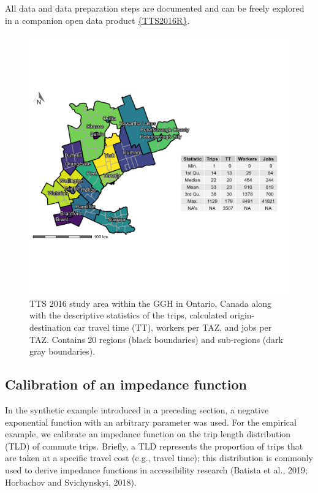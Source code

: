 \documentclass[]{elsarticle} %
\begin{document}
All data and data preparation steps are documented and can be freely
explored in a companion open data product
\href{https://github.com/soukhova/TTS2016R}{\{TTS2016R\}}.

\begin{figure}

{\centering \includegraphics[width=0.8\linewidth]{images/TTS16-survey-area} 

}

\caption{\label{fig:TTS-16-survey-area}TTS 2016 study area within the GGH in Ontario, Canada along with the descriptive statistics of the trips, calculated origin-destination car travel time (TT), workers per TAZ, and jobs per TAZ. Contains 20 regions (black boundaries) and sub-regions (dark gray boundaries).}\label{fig:TTS-16-survey-area}
\end{figure}

\hypertarget{calibration-of-an-impedance-function}{%
\subsection{Calibration of an impedance
function}\label{calibration-of-an-impedance-function}}

In the synthetic example introduced in a preceding section, a negative
exponential function with an arbitrary parameter was used. For the
empirical example, we calibrate an impedance function on the trip length
distribution (TLD) of commute trips. Briefly, a TLD represents the
proportion of trips that are taken at a specific travel cost (e.g.,
travel time); this distribution is commonly used to derive impedance
functions in accessibility research (Batista et al., 2019; Horbachov and
Svichynskyi, 2018).
\end{document}

